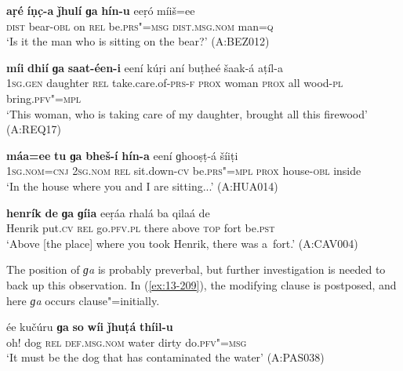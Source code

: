 \begin{exe}
\ex
\label{ex:13-205}
\gll \textbf{aṛé} \textbf{íṇc̣-a} \textbf{ǰhulí} \textbf{ɡa} \textbf{hín-u} eeṛó  míiš=ee \\
\textsc{dist} bear-\textsc{obl} on \textsc{rel} be.\textsc{prs"=msg} \textsc{dist.msg.nom}   man=\textsc{q} \\
\glt `Is it the man who is sitting on the bear?' (A:BEZ012)

\ex
\label{ex:13-206}
\gll \textbf{míi} \textbf{dhií} \textbf{ɡa} \textbf{saat-éen-i} eení kúṛi  aní buṭheé šaak-á aṭíl-a \\
\textsc{1sg.gen} daughter \textsc{rel} take.care.of-\textsc{prs-f} \textsc{prox} woman \textsc{prox} all wood-\textsc{pl} bring.\textsc{pfv"=mpl} \\
\glt `This woman, who is taking care of my daughter, brought all this firewood' (A:REQ17)

\ex
\label{ex:13-207}
\gll \textbf{máa=ee} \textbf{tu} \textbf{ɡa} \textbf{bheš-í} \textbf{hín-a}  eení ɡhooṣṭ-á šíiṭi\\
\textsc{1sg.nom=cnj} \textsc{2sg.nom} \textsc{rel} sit.down-\textsc{cv} be.\textsc{prs"=mpl} \textsc{prox} house-\textsc{obl} inside\\
\glt `In the house where you and I are sitting...' (A:HUA014)

\ex
\label{ex:13-208}
\gll \label{bkm:Ref190845659}\textbf{henrík} \textbf{de} \textbf{ɡa} \textbf{ɡíia} eeṛáa rhalá ba  qilaá de \\
Henrik put.\textsc{cv} \textsc{rel} go.\textsc{pfv.pl}  there above \textsc{top} fort be.\textsc{pst } \\
\glt `Above [the place] where you took Henrik, there was a~fort.' (A:CAV004) 
\end{exe}

The position of \textit{ɡa} is probably preverbal, but further investigation is needed to back up this observation. In (\ref{ex:13-209}), the modifying clause is postposed, and here \textit{ɡa} occurs clause"=initially.

\begin{exe}
\ex
\label{ex:13-209}
\gll ée kučúru \textbf{ɡa} \textbf{so} \textbf{wíi} \textbf{ǰhuṭá} \textbf{thíil-u}  \\
oh! dog \textsc{rel} \textsc{def.msg.nom} water dirty do.\textsc{pfv"=msg} \\
\glt `It must be the dog that has contaminated the water' (A:PAS038) 
\end{exe}


